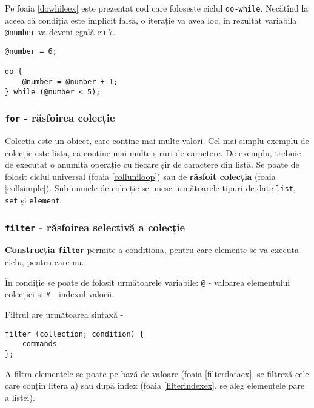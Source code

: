 Pe foaia \ref{dowhileex} este prezentat cod care folosește ciclul \texttt{do-while}. Necătînd la aceea că condiția este implicit falsă, o iterație va avea loc, în rezultat variabila \texttt{@number} va deveni egală cu 7.

\begin{sourcecode}
\label{dowhileex}
\begin{verbatim}
@number = 6;

do {
	@number = @number + 1;
} while (@number < 5);
\end{verbatim}
\end{sourcecode}

\subsubsection{\texttt{for} - răsfoirea colecție}

{Colecția} este un obiect, care conține mai multe valori. Cel mai simplu exemplu de colecție este lista, ea conține mai multe șiruri de caractere. De exemplu, trebuie de executat o anumită operație cu fiecare șir de caractere din listă. Se poate de folosit ciclul universal (foaia \ref{colluniloop}) sau de {\bf răsfoit colecția} (foaia \ref{collsimple}). Sub numele de colecție se unesc următoarele tipuri de date \texttt{list}, \texttt{set} și \texttt{element}.

\subsubsection{\texttt{filter} - răsfoirea selectivă a colecție}

{\bf Construcția \texttt{filter}} permite a condiționa, pentru care elemente se va executa ciclu, pentru care nu.

În condiție se poate de folosit următoarele variabile: \texttt{@} - valoarea elementului colecției și \texttt{#} - indexul valorii.

Filtrul are următoarea sintaxă -
\begin{verbatim}
filter (collection; condition) {
	commands
};
\end{verbatim}

A filtra elementele se poate pe bază de valoare (foaia \ref{filterdataex}, se filtreză cele care conțin litera a) sau după index (foaia \ref{filterindexex}, se aleg elementele pare a listei).

